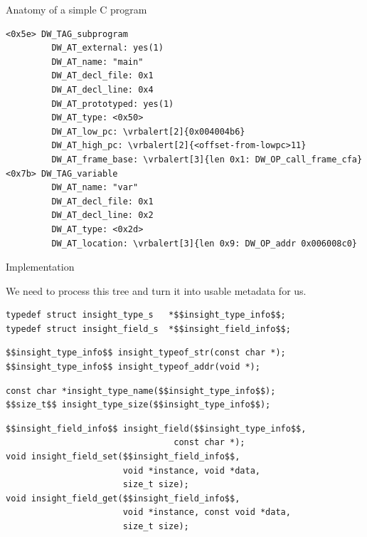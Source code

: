 \documentclass[10pt]{beamer}
\newcommand{\vrbalert}[2][]{%
  \if\relax\detokenize{#1}\relax%
    \alert{#2}%
  \else
    \alert<#1>{#2}%
  \fi}
\begin{document}
\begin{frame}[fragile]{Anatomy of a simple C program}
\begin{Verbatim}[commandchars=\\\{\},fontsize=\small,frame=single]
<0x5e> DW_TAG_subprogram
         DW_AT_external: yes(1)
         DW_AT_name: "main"
         DW_AT_decl_file: 0x1
         DW_AT_decl_line: 0x4
         DW_AT_prototyped: yes(1)
         DW_AT_type: <0x50>
         DW_AT_low_pc: \vrbalert[2]{0x004004b6}
         DW_AT_high_pc: \vrbalert[2]{<offset-from-lowpc>11}
         DW_AT_frame_base: \vrbalert[3]{len 0x1: DW_OP_call_frame_cfa}
<0x7b> DW_TAG_variable
         DW_AT_name: "var"
         DW_AT_decl_file: 0x1
         DW_AT_decl_line: 0x2
         DW_AT_type: <0x2d>
         DW_AT_location: \vrbalert[3]{len 0x9: DW_OP_addr 0x006008c0}
\end{Verbatim}
\end{frame}

\begin{frame}[fragile]{Implementation}

  We need to process this tree and turn it into usable metadata for us.

  \pause{}

  \begin{lstlisting}
typedef struct insight_type_s   *$$insight_type_info$$;
typedef struct insight_field_s  *$$insight_field_info$$;
  \end{lstlisting}

  \pause{}

  \begin{lstlisting}
$$insight_type_info$$ insight_typeof_str(const char *);
$$insight_type_info$$ insight_typeof_addr(void *);
  \end{lstlisting}
  \pause{}
  \begin{lstlisting}
const char *insight_type_name($$insight_type_info$$);
$$size_t$$ insight_type_size($$insight_type_info$$);
  \end{lstlisting}
  \pause{}
  \begin{lstlisting}
$$insight_field_info$$ insight_field($$insight_type_info$$,
                                 const char *);
void insight_field_set($$insight_field_info$$,
                       void *instance, void *data,
                       size_t size);
void insight_field_get($$insight_field_info$$,
                       void *instance, const void *data,
                       size_t size);
  \end{lstlisting}

\end{frame}
\end{document}
